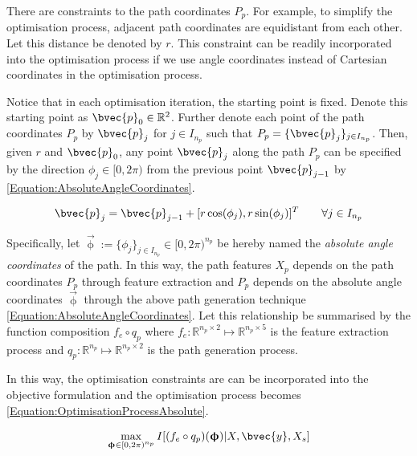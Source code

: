 			There are constraints to the path coordinates $P_{p}$. For example, to simplify the optimisation process, adjacent path coordinates are equidistant from each other. Let this distance be denoted by $r$. This constraint can be readily incorporated into the optimisation process if we use angle coordinates instead of Cartesian coordinates in the optimisation process.
			
			Notice that in each optimisation iteration, the starting point is fixed. Denote this starting point as $\bvec{p}_{0} \in \mathbb{R}^{2}$. Further denote each point of the path coordinates $P_{p}$ by $\bvec{p}_{j}$ for $j \in I_{n_{p}}$ such that $P_{p} = \{\bvec{p}_{j}\}_{j \in I_{n_{p}}}$. Then, given $r$ and $\bvec{p}_{0}$, any point $\bvec{p}_{j}$ along the path $P_{p}$ can be specified by the direction $\phi_{j} \in [0, 2 \pi)$ from the previous point $\bvec{p}_{j - 1}$ by \eqref{Equation:AbsoluteAngleCoordinates}.
				
			\begin{equation}			
				\bvec{p}_{j} = \bvec{p}_{j - 1} + [r \cos(\phi_{j}), r \sin(\phi_{j})]^{T}	\qquad \forall j \in I_{n_{p}}			
			\label{Equation:AbsoluteAngleCoordinates}			
			\end{equation}
			
			Specifically, let $\vec{\upphi} := \{\phi_{j}\}_{j \in I_{n_{p}}} \in [0, 2 \pi)^{n_{p}}$ be hereby named the \textit{absolute angle coordinates} of the path. In this way, the path features $X_{p}$ depends on the path coordinates $P_{p}$ through feature extraction and $P_{p}$ depends on the absolute angle coordinates $\vec{\upphi}$ through the above path generation technique \eqref{Equation:AbsoluteAngleCoordinates}. Let this relationship be summarised by the function composition $f_{e} \circ q_{p}$ where $f_{e}: \mathbb{R}^{n_{p} \times 2} \mapsto \mathbb{R}^{n_{p} \times 5}$ is the feature extraction process and $q_{p}: \mathbb{R}^{n_{p}} \mapsto \mathbb{R}^{n_{p} \times 2}$ is the path generation process.
			
			In this way, the optimisation constraints are can be incorporated into the objective formulation and the optimisation process becomes \eqref{Equation:OptimisationProcessAbsolute}.
			
			\begin{equation}
				\max_{\vec{\upphi} \in [0, 2 \pi)^{n_{p}}} I[(f_{e} \circ q_{p})(\vec{\upphi}) | X, \bvec{y}, X_{s}]				
			\label{Equation:OptimisationProcessAbsolute}
			\end{equation}	
			
